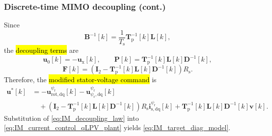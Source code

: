 \begin{frame}
    \frametitle{Discrete-time MIMO decoupling (cont.)}
    Since
    \begin{equation}
        \bm{B}^{-1}[k]=\frac{1}{T_\mathrm{s}}\bm{T}_{\mathrm{p}}^{-1}[k]\bm{L}[k],
    \end{equation}\pause%
    the \hl{decoupling terms} are
    \begin{equation}
        \bm{u}_\mathrm{0}[k]=-\bm{u}_\mathrm{x}[k],
        \qquad
        \bm{P}[k]=\bm{T}_{\mathrm{p}}^{-1}[k]\bm{L}[k]\bm{D}^{-1}[k],
    \end{equation}
    \begin{equation}
        \bm{F}[k]=\left(\bm{I}_2-\bm{T}_{\mathrm{p}}^{-1}[k]\bm{L}[k]\bm{D}^{-1}[k]\right)R_\mathrm{s}.
    \end{equation}\pause%
    Therefore, the \hl{modified stator-voltage command} is
    \begin{equation}
        \begin{split}
            \bm{u}^{*}[k]
             & =-\bm{u}^{\psi_\mathrm{r}}_{\mathrm{rot},\mathrm{dq}}[k]
            -\bm{u}^{\psi_\mathrm{r}}_{\psi_\mathrm{r},\mathrm{dq}}[k]                                                                                        \\
             & \quad+\left(\bm{I}_2-\bm{T}_{\mathrm{p}}^{-1}[k]\bm{L}[k]\bm{D}^{-1}[k]\right)R_\mathrm{s}\bm{i}^{\psi_\mathrm{r}}_{\mathrm{s},\mathrm{dq}}[k]
            +\bm{T}_{\mathrm{p}}^{-1}[k]\bm{L}[k]\bm{D}^{-1}[k]\bm{v}[k].
        \end{split}
        \label{eq:IM_decoupling_law}
    \end{equation}
    Substitution of \eqref{eq:IM_decoupling_law} into \eqref{eq:IM_current_control_qLPV_plant} yields \eqref{eq:IM_target_diag_model}.
\end{frame}

